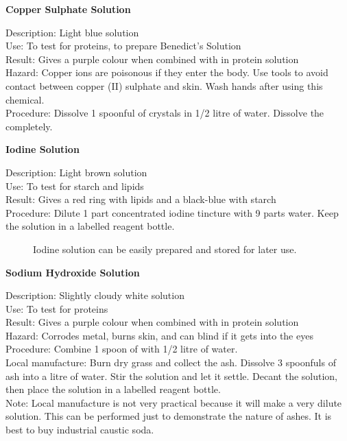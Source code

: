 \begin{flushleft}
\textbf{Copper Sulphate Solution}
\end{flushleft}
\vspace{-10pt}
Description: Light blue solution\\
Use: To test for proteins, to prepare Benedict's Solution\\
Result: Gives a purple colour when combined with  in protein solution\\
Hazard: Copper ions are poisonous if they enter the body. Use tools to avoid contact between copper (II) sulphate and skin. Wash hands after using this chemical.\\
Procedure: Dissolve 1 spoonful of  crystals in 1/2 litre of water. Dissolve the  completely.\\

\begin{flushleft}
\textbf{Iodine Solution}
\end{flushleft}
\vspace{-10pt}
Description: Light brown solution\\
Use: To test for starch and lipids\\
Result: Gives a red ring with lipids and a black-blue with starch\\
Procedure: Dilute 1 part concentrated iodine tincture with 9 parts water. Keep the solution in a labelled reagent bottle.\\

\begin{figure}[h]
\begin{center}
\def\svgwidth{2cm}

\caption{Iodine solution can be easily prepared and stored for later use.}
\label{fig:iodine}
\end{center}
\end{figure}

\begin{flushleft}
\textbf{Sodium Hydroxide Solution}
\end{flushleft}
\vspace{-10pt}
Description: Slightly cloudy white solution\\
Use: To test for proteins\\
Result: Gives a purple colour when combined with  in protein solution\\
Hazard: Corrodes metal, burns skin, and can blind if it gets into the eyes\\
Procedure: Combine 1 spoon of  with 1/2 litre of water.\\
Local manufacture: Burn dry grass and collect the ash. Dissolve 3 spoonfuls of ash into a litre of water. Stir the solution and let it settle. Decant the solution, then place the solution in a labelled reagent bottle.\\
Note: Local manufacture is not very practical because it will make a very dilute solution. This can be performed just to demonstrate the nature of ashes. It is best to buy industrial caustic soda.\\
